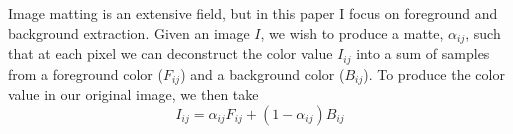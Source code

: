 Image matting is an extensive field, but in this paper I focus on foreground and background extraction. Given an image $I$, we wish to produce a matte, $\alpha_{ij}$, such that at each pixel we can deconstruct the color value $I_{ij}$ into a sum of samples from a foreground color ($F_{ij}$) and a background color ($B_{ij}$). To produce the color value in our original image, we then take
\[I_{ij}=\alpha_{ij}F_{ij}+(1-\alpha_{ij})B_{ij}\]